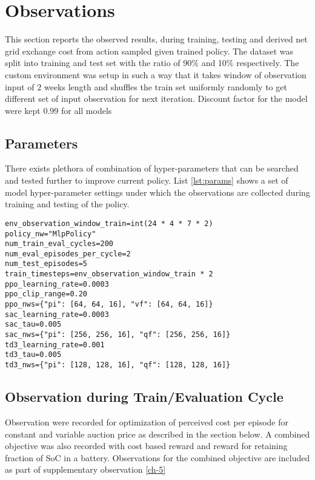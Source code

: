 \chapter{Observations} \label{ch-4}

\begin{large}

This section reports the observed results, during training, testing and derived net grid exchange cost from action sampled given trained policy. The dataset was split into training and test set with the ratio of 90\% and 10\% respectively. The custom environment was setup in such a way that it takes window of observation input of $2$ weeks length and shuffles the train set uniformly randomly to get different set of input observation for next iteration. Discount factor for the model were kept $0.99$ for all models\\

\section{Parameters}

There exists plethora of combination of hyper-parameters that can be searched and tested further to improve current policy. List \ref{lst:params} shows a set of model hyper-parameter settings under which the observations are collected during training and testing of the policy.\\

\begin{lstlisting}
env_observation_window_train=int(24 * 4 * 7 * 2)
policy_nw="MlpPolicy"
num_train_eval_cycles=200
num_eval_episodes_per_cycle=2
num_test_episodes=5
train_timesteps=env_observation_window_train * 2
ppo_learning_rate=0.0003
ppo_clip_range=0.20
ppo_nws={"pi": [64, 64, 16], "vf": [64, 64, 16]} 
sac_learning_rate=0.0003
sac_tau=0.005
sac_nws={"pi": [256, 256, 16], "qf": [256, 256, 16]}
td3_learning_rate=0.001
td3_tau=0.005
td3_nws={"pi": [128, 128, 16], "qf": [128, 128, 16]}
\end{lstlisting}


\section{Observation during Train/Evaluation Cycle}

Observation were recorded for optimization of perceived cost per episode for constant and variable auction price as described in the section below. A combined objective was also recorded with cost based reward and reward for retaining fraction of SoC in a battery. Observations for the combined objective are included as part of supplementary observation \ref{ch-5} \\


\end{large}

